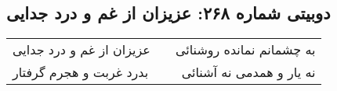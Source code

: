 \begin{center}
\section*{دوبیتی شماره ۲۶۸: عزیزان از غم و درد جدایی}
\label{sec:268}
\begin{longtable}{l p{0.5cm} r}
عزیزان از غم و درد جدایی
&&
به چشمانم نمانده روشنائی
\\
بدرد غربت و هجرم گرفتار
&&
نه یار و همدمی نه آشنائی
\\
\end{longtable}
\end{center}
